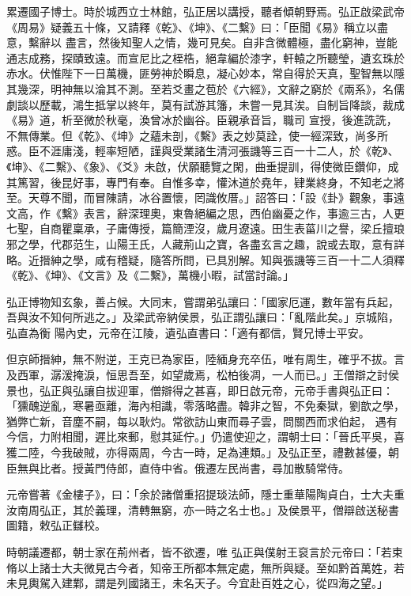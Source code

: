 \begin{pinyinscope}
 累遷國子博士。時於城西立士林館，弘正居以講授，聽者傾朝野焉。弘正啟梁武帝《周易》疑義五十條，又請釋《乾》、《坤》、《二繫》曰：「臣聞《易》稱立以盡意，繫辭以
 盡言，然後知聖人之情，幾可見矣。自非含微體極，盡化窮神，豈能通志成務，探賾致遠。而宣尼比之桎梏，絕韋編於漆字，軒轅之所聽瑩，遺玄珠於赤水。伏惟陛下一日萬機，匪勞神於瞬息，凝心妙本，常自得於天真，聖智無以隱其幾深，明神無以淪其不測。至若爻畫之苞於《六經》，文辭之窮於《兩系》，名儒劇談以歷載，鴻生抵掌以終年，莫有試游其籓，未嘗一見其涘。自制旨降談，裁成《易》道，析至微於秋毫，渙曾冰於幽谷。臣親承音旨，職司
 宣授，後進詵詵，不無傳業。但《乾》、《坤》之蘊未剖，《繫》表之妙莫詮，使一經深致，尚多所惑。臣不涯庸淺，輕率短陋，謹與受業諸生清河張譏等三百一十二人，於《乾》、《坤》、《二繫》、《象》、《爻》未啟，伏願聽覽之閑，曲垂提訓，得使微臣鑽仰，成其篤習，後昆好事，專門有奉。自惟多幸，懽沐道於堯年，肄業終身，不知老之將至。天尊不聞，而冒陳請，冰谷置懷，罔識攸厝。」詔答曰：「設《卦》觀象，事遠文高，作《繫》表言，辭深理奧，東魯絕編之思，西伯幽憂之作，事逾三古，人更
 七聖，自商瞿稟承，子庸傳授，篇簡湮沒，歲月遼遠。田生表菑川之譽，梁丘擅琅邪之學，代郡范生，山陽王氏，人藏荊山之寶，各盡玄言之趣，說或去取，意有詳略。近搢紳之學，咸有稽疑，隨答所問，已具別解。知與張譏等三百一十二人須釋《乾》、《坤》、《文言》及《二繫》，萬機小暇，試當討論。」



 弘正博物知玄象，善占候。大同末，嘗謂弟弘讓曰：「國家厄運，數年當有兵起，吾與汝不知何所逃之。」及梁武帝納侯景，弘正謂弘讓曰：「亂階此矣。」京城陷，弘直為衡
 陽內史，元帝在江陵，遺弘直書曰：「適有都信，賢兄博士平安。



 但京師搢紳，無不附逆，王克已為家臣，陸緬身充卒伍，唯有周生，確乎不拔。言及西軍，潺湲掩淚，恒思吾至，如望歲焉，松柏後凋，一人而已。」王僧辯之討侯景也，弘正與弘讓自拔迎軍，僧辯得之甚喜，即日啟元帝，元帝手書與弘正曰：「獯醜逆亂，寒暑亟離，海內相識，零落略盡。韓非之智，不免秦獄，劉歆之學，猶弊亡新，音塵不嗣，每以耿灼。常欲訪山東而尋子雲，問關西而求伯起，
 遇有今信，力附相聞，遲比來郵，慰其延佇。」仍遣使迎之，謂朝士曰：「晉氏平吳，喜獲二陸，今我破賊，亦得兩周，今古一時，足為連類。」及弘正至，禮數甚優，朝臣無與比者。授黃門侍郎，直侍中省。俄遷左民尚書，尋加散騎常侍。



 元帝嘗著《金樓子》，曰：「余於諸僧重招提琰法師，隱士重華陽陶貞白，士大夫重汝南周弘正，其於義理，清轉無窮，亦一時之名士也。」及侯景平，僧辯啟送秘書圖籍，敕弘正讎校。



 時朝議遷都，朝士家在荊州者，皆不欲遷，唯
 弘正與僕射王裒言於元帝曰：「若束脩以上諸士大夫微見古今者，知帝王所都本無定處，無所與疑。至如黔首萬姓，若未見輿駕入建鄴，謂是列國諸王，未名天子。今宜赴百姓之心，從四海之望。」




\end{pinyinscope}
